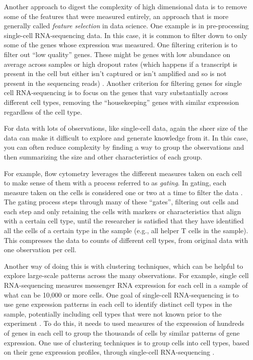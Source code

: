 \documentclass[]{tufte-book}
\begin{document}
Another approach to digest the complexity of high dimensional data is to remove
some of the features that were measured entirely, an approach that is more
generally called \emph{feature selection} in data science. One example is in
pre-processing single-cell RNA-sequencing data. In this case, it is common to filter
down to only some of the genes whose expression was measured. One filtering
criterion is to filter out ``low quality'' genes. These might be genes with low
abundance on average across samples or high dropout rates (which happens if
a transcript is present in the cell but either isn't captured or isn't amplified
and so is not present in the sequencing reads) \citep[
\citet{mccarthy2017scater}]{haque2017practical}. Another criterion for filtering genes for single cell
RNA-sequencing is to focus on the genes that vary substantially across different
cell types, removing the ``housekeeping'' genes with similar expression regardless
of the cell type.

For data with lots of observations, like single-cell data, again the sheer size
of the data can make it difficult to explore and generate knowledge from it. In
this case, you can often reduce complexity by finding a way to group the
observations and then summarizing the size and other characteristics of each
group.

For example, flow cytometry leverages the different measures taken on each cell
to make sense of them with a process referred to as \emph{gating}. In gating, each
measure taken on the cells is considered one or two at a time to filter the data
\citep{maecker2012standardizing}. The gating process steps through many of these
``gates'', filtering out cells and each step and only retaining the cells with
markers or characteristics that align with a certain cell type, until the
researcher is satisfied that they have identified all the cells of a certain
type in the sample (e.g., all helper T cells in the sample). This compresses the
data to counts of different cell types, from original data with one observation
per cell.

Another way of doing this is with clustering techniques, which can be helpful to
explore large-scale patterns across the many observations. For example, single
cell RNA-sequencing measures messenger RNA expression for each cell in a sample
of what can be 10,000 or more cells. One goal of single-cell RNA-sequencing is
to use gene expression patterns in each cell to identify distinct cell types in
the sample, potentially including cell types that were not known prior to the
experiment \citep{perkel2017single}. To do this, it needs to used measures of the
expression of hundreds of genes in each cell to group the thousands of cells by
similar patterns of gene expression. One use of clustering techniques is to
group cells into cell types, based on their gene expression profiles, through
single-cell RNA-sequencing \citep{haque2017practical}.
\end{document}
